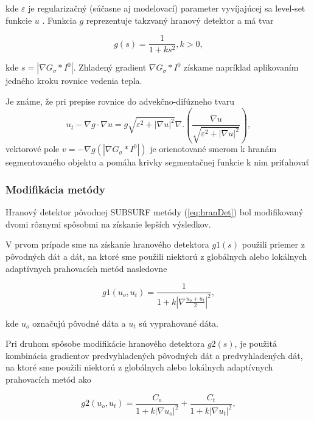 \documentclass[a4paper,11pt,oneside]{article}%
\def\epsilon{\varepsilon}
\begin{document}
kde $\epsilon$ je regularizačný (súčasne aj modelovací) parameter  vyvíjajúcej sa level-set  funkcie $u$ . Funkcia $g$ reprezentuje takzvaný hranový detektor a má tvar

\begin{equation} \label{eq:hranDet}
g(s) = \frac{1}{1+ks^2}, k > 0,
\end{equation}

kde $s = |\nabla G_\sigma*I^0|$. Zhladený gradient $\nabla G_\sigma*I^0$ získame napríklad aplikovaním jedného kroku rovnice vedenia tepla. 

Je známe, že pri prepise rovnice do advekčno-difúzneho tvaru
\begin{equation} \label{eq:advdiftvar}
u_t-\nabla g\cdot \nabla u=g \sqrt{\epsilon^2 + |\nabla u|^2}\nabla.\left( \frac{\nabla u}{\sqrt{\epsilon^2 + |\nabla u|^2}}\right),
\end{equation}
vektorové pole $ v=-\nabla g(|\nabla G_\sigma*I^0|) $  je orienotované smerom k hranám segmentovaného objektu a pomáha krivky segmentačnej funkcie k nim priťahovať

\subsubsection{Modifikácia metódy}   \label{HranDet}

Hranový detektor pôvodnej SUBSURF metódy (\ref{eq:hranDet}) bol modifikovaný dvomi rôznymi spôsobmi na získanie lepších výsledkov.

V prvom prípade sme na získanie hranového detektora $g1(s)$ použili priemer z pôvodných dát a dát, na ktoré sme použili niektorú z globálnych alebo lokálnych adaptívnych prahovacích metód nasledovne

\begin{equation} \label{eq:hdet1}
g1(u_o , u_t) = \frac{1}{1 + k|\nabla \frac{u_o + u_t}{2}|^2},
\end{equation}

kde $u_o$ označujú pôvodné dáta a $u_t$ sú vyprahované dáta. 

Pri druhom spôsobe modifikácie hranového detektora $g2(s)$\cite{sora}, je použitá kombinácia gradientov predvyhladených pôvodných dát a predvyhladených dát, na ktoré sme použili niektorú z globálnych alebo lokálnych adaptívnych prahovacích metód ako

\begin{equation} \label{eq:hdet2}
g2(u_o , u_t) = \frac{C_o}{1 + k|\nabla u_o|^2} + \frac{C_t}{1 + k|\nabla u_t|^2},
\end{equation}
\end{document}
